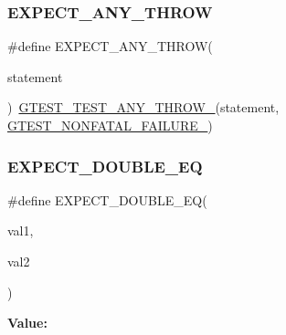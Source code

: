 \subsubsection{\texorpdfstring{EXPECT\_ANY\_THROW}{EXPECT\_ANY\_THROW}}
{\footnotesize\ttfamily \#define E\+X\+P\+E\+C\+T\+\_\+\+A\+N\+Y\+\_\+\+T\+H\+R\+OW(\begin{DoxyParamCaption}\item[{}]{statement }\end{DoxyParamCaption})~\mbox{\hyperlink{_obj__test_2lib_2googletest-release-1_88_81_2googletest_2include_2gtest_2internal_2gtest-internal_8h_af48bbd26d54d4afc5e4cef39b1c76ba3}{G\+T\+E\+S\+T\+\_\+\+T\+E\+S\+T\+\_\+\+A\+N\+Y\+\_\+\+T\+H\+R\+O\+W\+\_\+}}(statement, \mbox{\hyperlink{_obj__test_2lib_2googletest-release-1_88_81_2googletest_2include_2gtest_2internal_2gtest-internal_8h_a6cb7482cfa03661a91c698eb5895f642}{G\+T\+E\+S\+T\+\_\+\+N\+O\+N\+F\+A\+T\+A\+L\+\_\+\+F\+A\+I\+L\+U\+R\+E\+\_\+}})}

\mbox{\label{_obj__test_2lib_2googletest-master_2googletest_2include_2gtest_2gtest_8h_ab4852f9430cf656690256ea7fe6323b8}} 
\subsubsection{\texorpdfstring{EXPECT\_DOUBLE\_EQ}{EXPECT\_DOUBLE\_EQ}}
{\footnotesize\ttfamily \#define E\+X\+P\+E\+C\+T\+\_\+\+D\+O\+U\+B\+L\+E\+\_\+\+EQ(\begin{DoxyParamCaption}\item[{}]{val1,  }\item[{}]{val2 }\end{DoxyParamCaption})}

{\bfseries Value\+:}
\begin{DoxyCode}{0}

\end{DoxyCode}
\mbox{\label{_obj__test_2lib_2googletest-master_2googletest_2include_2gtest_2gtest_8h_a4159019abda84f5366acdb7604ff220a}} 
